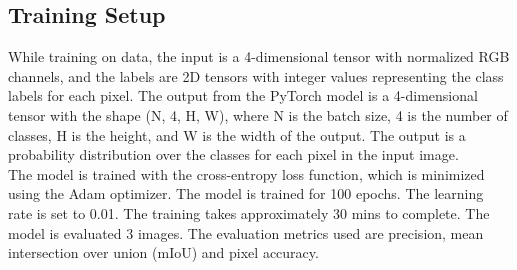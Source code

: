\subsection{Training Setup}
While training on data, the input is a 4-dimensional tensor with normalized RGB channels, and the labels are 2D tensors with integer values representing the class labels for each pixel. The output from the PyTorch model is a 4-dimensional tensor with the shape (N, 4, H, W), where N is the batch size, 4 is the number of classes, H is the height, and W is the width of the output. The output is a probability distribution over the classes for each pixel in the input image.
\\ The model is trained with the cross-entropy loss function, which is minimized using the Adam optimizer. The model is trained for 100 epochs. The learning rate is set to 0.01. The training takes approximately 30 mins to complete. The model is evaluated 3 images. The evaluation metrics used are precision, mean intersection over union (mIoU) and pixel accuracy.
